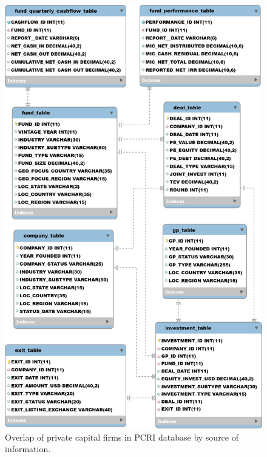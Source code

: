 
\begin{figure}
    \centering
\includegraphics[width=\widthpcrib]{./figures/pcrifigure2.png}
\caption{Overlap of private capital firms in PCRI database by source of information.\label{fig:pcrifigure2}}
\end{figure}
